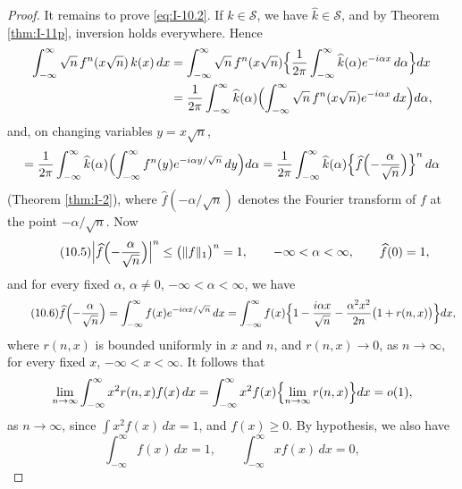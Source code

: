 \begin{proof}
It remains to prove \eqref{eq:I-10.2}. If $k\in\mathcal S$, we have $\widehat k\in\mathcal S$, and by Theorem \ref{thm:I-11p}, inversion holds everywhere. Hence
\begin{equation*}
\begin{aligned}
\int_{-\infty}^{\infty}\sqrt n\,f^n(x\sqrt n)\,k(x)\,dx &= \int_{-\infty}^{\infty}\sqrt n\,f^n(x\sqrt n)\Bigl\{\frac{1}{2\pi}\int_{-\infty}^{\infty}\widehat k(\alpha)e^{-i\alpha x}\,d\alpha\Bigr\}dx\\
&= \frac{1}{2\pi}\int_{-\infty}^{\infty}\widehat k(\alpha)\Bigl(\int_{-\infty}^{\infty}\sqrt n\,f^n(x\sqrt n)e^{-i\alpha x}\,dx\Bigr)d\alpha,
\end{aligned}
\end{equation*}
and, on changing variables $y=x\sqrt n$,
\begin{equation*}
=\frac{1}{2\pi}\int_{-\infty}^{\infty}\widehat k(\alpha)\Bigl(\int_{-\infty}^{\infty}f^n(y)e^{-i\alpha y/\sqrt n}\,dy\Bigr)d\alpha
=\frac{1}{2\pi}\int_{-\infty}^{\infty}\widehat k(\alpha)\Bigl\{\widehat f\Bigl(-\frac{\alpha}{\sqrt n}\Bigr)\Bigr\}^n\,d\alpha
\end{equation*}
(Theorem \ref{thm:I-2}), where $\widehat f(-\alpha/\sqrt n)$ denotes the Fourier transform of $f$ at the point $-\alpha/\sqrt n$. Now
\begin{equation}\label{eq:I-10.5}\tag{10.5}
\Bigl|\widehat f\Bigl(-\frac{\alpha}{\sqrt n}\Bigr)\Bigr|^n
\le\bigl(\|f\|_1\bigr)^n=1,\qquad-\infty<\alpha<\infty,\qquad \widehat f(0)=1,
\end{equation}
and for every fixed $\alpha$, $\alpha\neq 0$, $-\infty<\alpha<\infty$, we have
\begin{equation}\label{eq:I-10.6}\tag{10.6}
\widehat f\Bigl(-\frac{\alpha}{\sqrt n}\Bigr)
=\int_{-\infty}^{\infty}f(x)e^{-i\alpha x/\sqrt n}\,dx
=\int_{-\infty}^{\infty}f(x)\Bigl\{1-\frac{i\alpha x}{\sqrt n}-\frac{\alpha^{2}x^{2}}{2n}\bigl(1+r(n,x)\bigr)\Bigr\}dx,
\end{equation}
where $r(n,x)$ is bounded uniformly in $x$ and $n$, and $r(n,x)\to 0$, as $n\to\infty$, for every fixed $x$, $-\infty<x<\infty$. It follows that
\begin{equation*}
\lim_{n\to\infty}\int_{-\infty}^{\infty}x^{2}r(n,x)f(x)\,dx
=\int_{-\infty}^{\infty}x^{2}f(x)\Bigl\{\lim_{n\to\infty}r(n,x)\Bigr\}dx
=o(1),
\end{equation*}
as $n\to\infty$, since $\int x^{2}f(x)\,dx=1$, and $f(x)\ge 0$. By hypothesis, we also have
\begin{equation*}
\int_{-\infty}^{\infty}f(x)\,dx=1,\qquad \int_{-\infty}^{\infty}xf(x)\,dx=0,

\end{equation*}
\end{proof}
